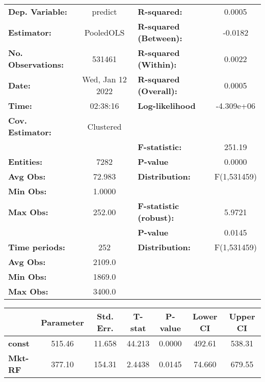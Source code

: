 \begin{center}
\begin{tabular}{lclc}
\toprule
\textbf{Dep. Variable:}    &      predict       & \textbf{  R-squared:         }   &      0.0005      \\
\textbf{Estimator:}        &     PooledOLS      & \textbf{  R-squared (Between):}  &     -0.0182      \\
\textbf{No. Observations:} &       531461       & \textbf{  R-squared (Within):}   &      0.0022      \\
\textbf{Date:}             &  Wed, Jan 12 2022  & \textbf{  R-squared (Overall):}  &      0.0005      \\
\textbf{Time:}             &      02:38:16      & \textbf{  Log-likelihood     }   &    -4.309e+06    \\
\textbf{Cov. Estimator:}   &     Clustered      & \textbf{                     }   &                  \\
\textbf{}                  &                    & \textbf{  F-statistic:       }   &      251.19      \\
\textbf{Entities:}         &        7282        & \textbf{  P-value            }   &      0.0000      \\
\textbf{Avg Obs:}          &       72.983       & \textbf{  Distribution:      }   &   F(1,531459)    \\
\textbf{Min Obs:}          &       1.0000       & \textbf{                     }   &                  \\
\textbf{Max Obs:}          &       252.00       & \textbf{  F-statistic (robust):} &      5.9721      \\
\textbf{}                  &                    & \textbf{  P-value            }   &      0.0145      \\
\textbf{Time periods:}     &        252         & \textbf{  Distribution:      }   &   F(1,531459)    \\
\textbf{Avg Obs:}          &       2109.0       & \textbf{                     }   &                  \\
\textbf{Min Obs:}          &       1869.0       & \textbf{                     }   &                  \\
\textbf{Max Obs:}          &       3400.0       & \textbf{                     }   &                  \\
\bottomrule
\end{tabular}
\begin{tabular}{lcccccc}
                & \textbf{Parameter} & \textbf{Std. Err.} & \textbf{T-stat} & \textbf{P-value} & \textbf{Lower CI} & \textbf{Upper CI}  \\
\midrule
\textbf{const}  &       515.46       &       11.658       &      44.213     &      0.0000      &       492.61      &       538.31       \\
\textbf{Mkt-RF} &       377.10       &       154.31       &      2.4438     &      0.0145      &       74.660      &       679.55       \\
\bottomrule
\end{tabular}
\end{center}
